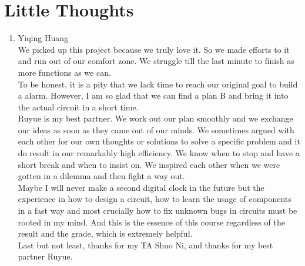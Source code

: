 \documentclass[12pt]{article}
\begin{document}
\section{Little Thoughts}
\begin{enumerate}
	\item Yiqing Huang\\
We picked up this project because we truly love it. So we made efforts to it and run out of our comfort zone. We struggle till the last minute to finish as more functions as we can.\\
To be honest, it is a pity that we lack time to reach our original goal to build a alarm. However, I am so glad that we can find a plan B and bring it into the actual circuit in a short time. \\
Ruyue is my best partner. We work out our plan smoothly and we exchange our ideas as soon as they came out of our minds. We sometimes argued with each other for our own thoughts or solutions to solve a specific problem and it do result in our remarkably high efficiency. We know when to stop and have a short break and when to insist on. We inspired each other when we were gotten in a dilemma and then fight a way out. \\
Maybe I will never make a second digital clock in the future but the experience in how to design a circuit, how to learn the usage of components in a fast way and most crucially how to fix unknown bugs in circuits must be rooted in my mind. And this is the essence of this course regardless of the result and the grade, which is extremely helpful. \\
Last but not least, thanks for my TA Shuo Ni, and thanks for my best partner Ruyue.\\


\end{enumerate}
\end{document}
